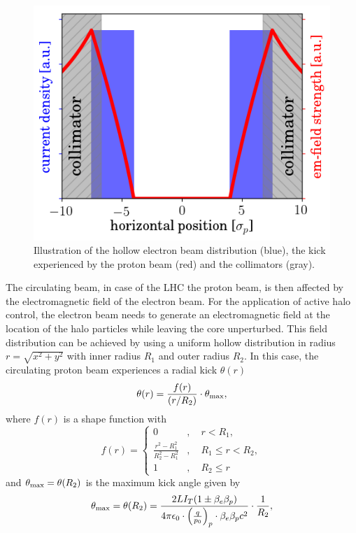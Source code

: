 \documentclass[%
 reprint,
 amsmath,amssymb,
 aps,
prstab,
]{revtex4-1}
\begin{document}
\begin{figure}[b]
	\includegraphics[width=0.8\linewidth]{kick_hel_lhc_no_grid}%
	\caption{\label{fig:hel_field} Illustration of the hollow electron beam distribution (blue), the kick experienced by the proton beam (red) and the collimators (gray).}
\end{figure}
The circulating beam, in case of the LHC the proton beam, is then affected by the electromagnetic field of the electron beam. For the application of active halo control, the electron beam needs to generate an electromagnetic field at the location of the halo particles while leaving the core unperturbed. This field distribution can be achieved by using a uniform hollow distribution in radius $r=\sqrt{x^2+y^2}$ with inner radius $R_1$ and outer radius $R_2$. In this case, the circulating proton beam experiences a radial kick $\theta(r)$
\begin{equation}\label{eq:field_1}
\theta(r)=\frac{f(r)}{(r/R_2)}\cdot \theta_{\rm max},
\end{equation}
where $f(r)$ is a shape function with
\begin{equation}\label{eq:field_2}
f(r) =
\begin{cases} 0 &,\quad r< R_1,\\
\frac{r^2-R_1^2}{R_2^2-R_1^2} &,\quad R_1 \leq r < R_2,\\
1 &,\quad R_2 \leq r
\end{cases}
\end{equation}
and $\theta_{\rm max}=\theta(R_2)$ is the maximum kick angle given by
\begin{equation}\label{hel_kick_max}
\theta_{\rm max} = \theta(R_2) = \frac{2LI_T(1\pm\beta_e\beta_p)}{4\pi\epsilon_0  \cdot \left(\frac{q}{p_0}\right)_p \cdot \beta_e\beta_p c^2}\cdot\frac{1}{R_2},
\end{equation}
\end{document}
